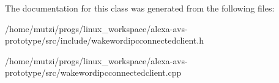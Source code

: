 The documentation for this class was generated from the following files\+:\begin{DoxyCompactItemize}
\item 
/home/mutzi/progs/linux\+\_\+workspace/alexa-\/avs-\/prototype/src/include/wakewordipcconnectedclient.\+h\item 
/home/mutzi/progs/linux\+\_\+workspace/alexa-\/avs-\/prototype/src/wakewordipcconnectedclient.\+cpp\end{DoxyCompactItemize}
